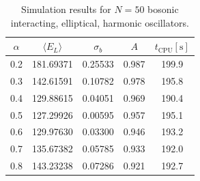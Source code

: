 \documentclass[
    a4paper, aps, twocolumn, floatfix, superscriptaddress, nofootinbib]{revtex4-1}
\newcommand{\1}{\mathds{1}}
\begin{document}
        \begin{table}
            \caption{Simulation results for $N = 50$ bosonic interacting,
            elliptical, harmonic oscillators.}
            \centering
            \begin{ruledtabular}
                \begin{tabular}{ccccc}
                    $\alpha$ & $\langle  E_L\rangle$ & $\sigma_b$
                    & $A$ & $t_{\text{CPU}} [\si{\second}]$ \\
                    \hline
                    0.2&181.69371&0.25533&0.987%
                    &199.9\\%
                    0.3&142.61591&0.10782&0.978%
                    &195.8\\%
                    0.4&129.88615&0.04051&0.969%
                    &190.4\\%
                    0.5&127.29926&0.00595&0.957%
                    &195.1\\%
                    0.6&129.97630&0.03300&0.946%
                    &193.2\\%
                    0.7&135.67382&0.05785&0.933%
                    &192.0\\%
                    0.8&143.23238&0.07286&0.921%
                    &192.7\\%
                \end{tabular}
            \end{ruledtabular}
            \label{tab:50_interacting}
        \end{table}
\end{document}
